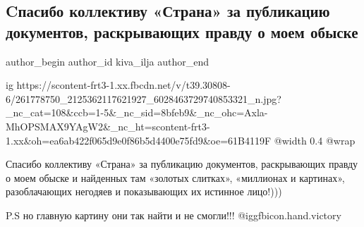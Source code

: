  
 
 
 
 
 
\subsection{Cпасибо коллективу «Страна» за публикацию документов, раскрывающих правду о моем обыске}
\label{sec:02_12_2021.fb.kiva_ilja.1.spasibo_strana}
 
\ifcmt
 author_begin
   author_id kiva_ilja
 author_end
\fi

\ifcmt
  ig https://scontent-frt3-1.xx.fbcdn.net/v/t39.30808-6/261778750_2125362117621927_6028463729740853321_n.jpg?_nc_cat=108&ccb=1-5&_nc_sid=8bfeb9&_nc_ohc=Axla-MhOPSMAX9YAgW2&_nc_ht=scontent-frt3-1.xx&oh=ea6ab422f065d9e0f86b5d4400e75fd9&oe=61B4119F
  @width 0.4
  @wrap 
\fi

Спасибо коллективу «Страна» за публикацию документов, раскрывающих правду о
моем обыске и найденных там «золотых слитках», «миллионах и картинах»,
разоблачающих негодяев и показывающих их истинное лицо!))) 

P.S но главную картину они так найти и не смогли!!! @igg{fbicon.hand.victory}

